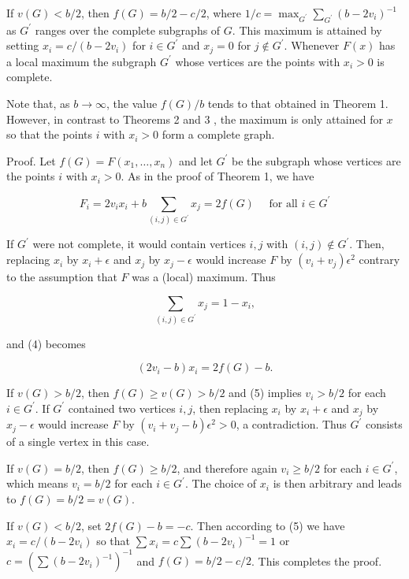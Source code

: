 \documentclass[10pt]{article}
\begin{document}
If \(v(G)<b / 2\), then \(f(G)=b / 2-c / 2\), where \(1 / c=\max _{G^{\prime}} \sum_{G^{\prime}}\left(b-2 v_{i}\right)^{-1}\) as \(G^{\prime}\) ranges over the complete subgraphs of \(G\). This maximum is attained by setting \(x_{i}=c /\left(b-2 v_{i}\right)\) for \(i \in G^{\prime}\) and \(x_{j}=0\) for \(j \notin G^{\prime}\). Whenever \(F(x)\) has a local maximum the subgraph \(G^{\prime}\) whose vertices are the points with \(x_{i}>0\) is complete.

Note that, as \(b \rightarrow \infty\), the value \(f(G) / b\) tends to that obtained in Theorem 1. However, in contrast to Theorems 2 and 3 , the maximum is only attained for \(x\) so that the points \(i\) with \(x_{i}>0\) form a complete graph.

Proof. Let \(f(G)=F\left(x_{1}, \ldots, x_{n}\right)\) and let \(G^{\prime}\) be the subgraph whose vertices are the points \(i\) with \(x_{i}>0\). As in the proof of Theorem 1, we have

\[
F_{i}=2 v_{i} x_{i}+b \sum_{(i, j) \in G^{\prime}} x_{j}=2 f(G) \quad \text { for all } i \in G^{\prime}
\]

If \(G^{\prime}\) were not complete, it would contain vertices \(i, j\) with \((i, j) \notin G^{\prime}\). Then, replacing \(x_{i}\) by \(x_{i}+\epsilon\) and \(x_{j}\) by \(x_{j}-\epsilon\) would increase \(F\) by \(\left(v_{i}+v_{j}\right) \epsilon^{2}\) contrary to the assumption that \(F\) was a (local) maximum. Thus

\[
\sum_{(i, j) \in G^{\prime}} x_{j}=1-x_{i},
\]

and (4) becomes

\[
\left(2 v_{i}-b\right) x_{i}=2 f(G)-b .
\]

If \(v(G)>b / 2\), then \(f(G) \geqslant v(G)>b / 2\) and (5) implies \(v_{i}>b / 2\) for each \(i \in G^{\prime}\). If \(G^{\prime}\) contained two vertices \(i, j\), then replacing \(x_{i}\) by \(x_{i}+\epsilon\) and \(x_{j}\) by\\
\(x_{j}-\epsilon\) would increase \(F\) by \(\left(v_{i}+v_{j}-b\right) \epsilon^{2}>0\), a contradiction. Thus \(G^{\prime}\) consists of a single vertex in this case.

If \(v(G)=b / 2\), then \(f(G) \geqslant b / 2\), and therefore again \(v_{i} \geqslant b / 2\) for each \(i \in G^{\prime}\), which means \(v_{i}=b / 2\) for each \(i \in G^{\prime}\). The choice of \(x_{i}\) is then arbitrary and leads to \(f(G)=b / 2=v(G)\).

If \(v(G)<b / 2\), set \(2 f(G)-b=-c\). Then according to (5) we have \(x_{i}=c /\left(b-2 v_{i}\right)\) so that \(\sum x_{i}=c \sum\left(b-2 v_{i}\right)^{-1}=1\) or \(c=\left(\sum\left(b-2 v_{i}\right)^{-1}\right)^{-1}\) and \(f(G)=b / 2-c / 2\). This completes the proof.
\end{document}
